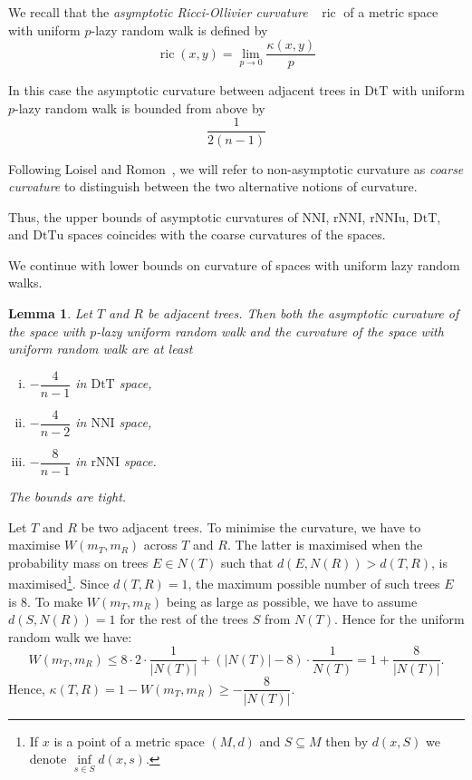 \documentclass{amsart}
\newtheorem{lemma}{Lemma}
\newcommand{\nni}{\mathrm{NNI}}
\newcommand{\rnni}{\mathrm{rNNI}}
\newcommand{\rnniu}{\mathrm{rNNIu}}
\newcommand{\mdts}{\mathrm{DtT}}
\newcommand{\mdtsu}{\mathrm{DtTu}}
\newcommand{\ric}{\operatorname{ric}}
\begin{document}
We recall that the {\em asymptotic Ricci-Ollivier curvature}~\cite{Loisel2014-gu} $\ric$ of a metric space with uniform $p$-lazy random walk is defined by
\[
\ric(x,y) = \lim_{p\to0} \frac{\kappa(x,y)}{p}
\]

In this case the asymptotic curvature between adjacent trees in $\mdts$ with uniform $p$-lazy random walk is bounded from above by
\[
\frac{1}{2(n-1)}
\]

Following Loisel and Romon~\cite{Loisel2014-gu}, we will refer to non-asymptotic curvature as {\em coarse curvature} to distinguish between the two alternative notions of curvature.


Thus, the upper bounds of asymptotic curvatures of $\nni$, $\rnni$, $\rnniu$, $\mdts$, and $\mdtsu$ spaces coincides with the coarse curvatures of the spaces.

We continue with lower bounds on curvature of spaces with uniform lazy random walks.

\begin{lemma}\label{uniformLower}
Let $T$ and $R$ be adjacent trees.
Then both the asymptotic curvature of the space with $p$-lazy uniform random walk and the curvature of the space with uniform random walk are at least 
\begin{enumerate}[(i)]
\item $-\dfrac{4}{n-1}$ in $\mdts$ space,
\item $-\dfrac{4}{n-2}$ in $\nni$ space,
\item $-\dfrac{8}{n-1}$ in $\rnni$ space.
\end{enumerate}

The bounds are tight.
\end{lemma}

\proof
Let $T$ and $R$ be two adjacent trees.
To minimise the curvature, we have to maximise $W(m_T, m_R)$ across $T$ and $R$.
The latter is maximised when the probability mass on trees $E\in N(T)$ such that $d(E, N(R)) > d(T, R)$, is
maximised\footnote{If $x$ is a point of a metric space $(M,d)$ and $S \subseteq M$ then by $d(x,S)$ we denote $\inf\limits_{s \in S} d(x,s)$.}.
Since $d(T, R) = 1$, the maximum possible number of such trees $E$ is
$8$.
To make $W(m_T,m_R)$ being as large as possible, we have to assume $d(S, N(R)) = 1$ for the rest of the trees $S$ from $N(T)$.
Hence for the uniform random walk we have:
\[
W(m_T,m_R)\leq 8 \cdot 2 \cdot \frac{1}{|N(T)|} +
(|N(T)| - 8) \cdot \frac{1}{N(T)} = 1 + \dfrac{8}{|N(T)|}.
\]
Hence, $\kappa(T,R) = 1 - W(m_T,m_R) \geq - \dfrac{8}{|N(T)|}$.
\end{document}
